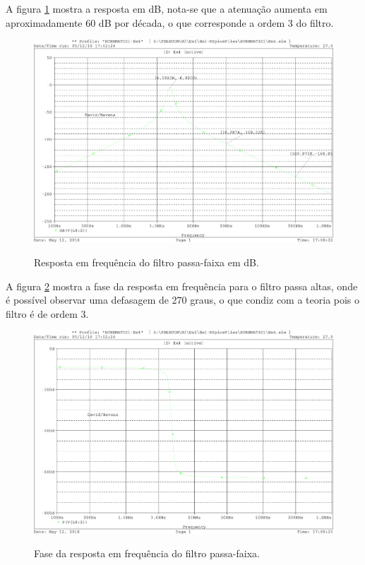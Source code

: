 A figura \ref{fig:resp_freq_db_4} mostra a resposta em dB, nota-se que a 
atenuação aumenta em aproximadamente 60 dB por década, o que corresponde a 
ordem 3 do filtro.

\begin{figure}[!h]
  \centering
  
  \includegraphics[scale=0.3]{Imagens/resp_freq_db_4}
  \label{fig:resp_freq_db_4}
  \caption{Resposta em frequência do filtro passa-faixa em dB.}
\end{figure}

A figura \ref{fig:resp_freq_phase_4} mostra a fase da resposta em frequência 
para o filtro passa altas, onde é possível observar uma defasagem de 270 graus, 
o que condiz com a teoria pois o filtro é de ordem 3.

\begin{figure}[!h]
  \centering
  
  \includegraphics[scale=0.3]{Imagens/resp_freq_phase_4}
  \label{fig:resp_freq_phase_4}
  \caption{Fase da resposta em frequência do filtro passa-faixa.}
\end{figure}